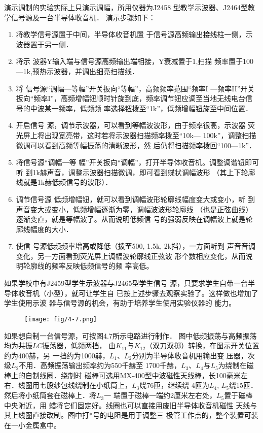 演示调制的实验实际上只演示调幅，所用仪器为J2458
型教学示波器、J2464型教学信号源及一台半导体收音机．
演示步骤如下：
\begin{enumerate}
\item 将教学信号源置于中间，半导体收音机置
于信号源高频输出接线柱一侧，示波器置于另一侧．
\item 将示
波器Y输入端与信号源高频输出端相接，Y衰减置于1,扫描
频率置于100—1k,预热示波器，并调出细亮扫描线．
\item 将
信号源“调幅—等幅”开关扳向“等幅”，高频频率范围“频率I
—频率II”开关扳向“频率I”，高频增幅钮顺时针旋到底，频率调节钮应调至当地无线电台信号的中波某一频率，低频频
率选择钮拨至“1k”，低频增幅钮旋至中间位置．
\item 开启信号
源，调节示波器，可以看到等幅波波形，由于频率很高，示波器
荧光屏上将出现宽亮带，这时若将示波器扫描频率拨至“10k—
100k”，调整扫描微调可以看到高频等幅振荡的清晰波形，然
后仍将扫描频率拨回“100—1k”．
\item 将信号源“调幅一等
幅”开关扳向“调幅”，打开半导体收音机。调整调谐钮即可听
到1k赫声音，调整示波器扫描微调，即可看到蝶状调幅波形
（其上下轮廓线就是1k赫低频信号的波形）．
\item 调节信号源
低频增幅钮，就可以看到调幅波形轮廓线幅度变大或变小，听
到声音变大或变小，低频增幅逐渐为零，调幅波波形轮廓线
（也是正弦曲线）逐渐变直，就是等幅波了。从而说明低频信
号的强弱反映在调幅波上就是轮廓线幅度的大小．
\item 使信
号源低频频率增高或降低（拨至500, 1.5k, 2k挡），一方面听到
声音音调变化，另一方面看到荧光屏上调幅波轮廓线正弦波
形个数相应变化，从而说明轮廓线的频率反映低频信号的频
率高低。
\end{enumerate}


如果学校中有J2459型学生示波器与J2465型学生信号
源，只要求学生自带一台半导体收音机（小型），就可让学生自
已按上述步骤去观察实验了。这样做也增加了学生使用示波
器与信号源的机会，有助于培养学生使用实验仪器的
能力。

\begin{figure}[htp]
    \centering
\texttt{[image: fig/4-7.png]}
    \caption{}
\end{figure}

如果想自制一台信号源，可按图4.7所示电路进行制作．
图中低频振荡与高频振荡均为共振$LC$振荡器，低频两挡，
由$K_{11}$与$K_{12}$（双刀双掷）转换，在图示开关位置约为400赫，另
一挡约为1000赫，$L_1$、$L_2$分别为半导体收音机用输出变
压器，次级$L_2$不用．高频振荡输出频率约为550千赫至
1700千赫，$L_3$、$L_4$与$L_5$为绕制在磁棒上的自制线圈．绕制时
磁棒可选用MX-400型中波磁性天线棒，长100毫米左
右．线圈用七股纱包线绕制在小纸筒上，$L_3$绕76匝，继续绕
4匝为$L_4$, $L_5$绕15匝．然后将小纸筒套在磁棒上．将$L_3$一
端置于磁棒一端约2厘米左右处，$L_5$置于磁棒中央附近，用
蜡将它们固定好。线圈也可以直接用废旧半导体收音机磁性
天线与其上线圈直接改制。图中打*号的电阻是用于调整三
极管工作点的，整个装置可装在一小金属盒中。

